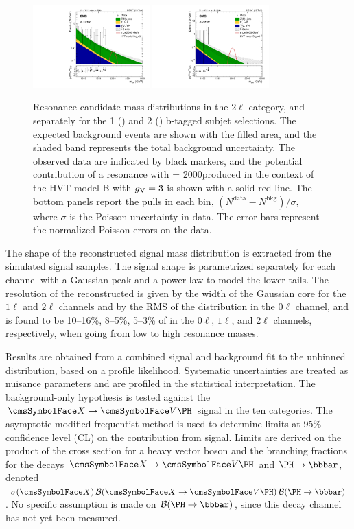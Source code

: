 \begin{figure}[!hbtp]\centering
 \includegraphics[width=0.40\textwidth]{B2G-16-003/Figure_002-e.pdf}
  \includegraphics[width=0.40\textwidth]{B2G-16-003/Figure_002-f.pdf}

  \caption{
    Resonance candidate mass \mVH distributions in the $2\ell$ category, and separately for the 1 (\cmsLeft) and 2 (\cmsRight) b-tagged 
subjet selections. The expected background events are shown with the filled area, and the shaded band represents the total background 
uncertainty. The observed data are indicated by black markers, and the potential contribution of a resonance with \mX = 2000\GeV produced 
in the context of the HVT model B with $g_\text{V}=3$ is shown with a solid red line. The bottom panels report the pulls in each bin, 
$(N^\text{data}-N^\text{bkg})/\sigma$, where $\sigma$ is the Poisson uncertainty in data. The error bars represent the normalized 
Poisson errors on the data.
    \label{fig:mX} }
\end{figure}



The shape of the reconstructed signal mass distribution is extracted from the simulated signal samples. The signal shape is parametrized 
separately for each channel with a Gaussian peak and a power law to model the lower tails.
The resolution of the reconstructed \mVH is given by the width of the Gaussian core for the $1\ell$ and $2\ell$ channels and by the RMS of 
the \mtVH distribution in the $0\ell$ channel, and is found to be 10--16\%, 8--5\%, 5--3\% of \mX in the $0\ell$, $1\ell$, and $2\ell$ 
channels, respectively, when going from low to high resonance masses.


Results are obtained from a combined signal and background fit to the unbinned \mVH distribution, based on a profile likelihood. Systematic 
uncertainties are treated as nuisance parameters and are profiled in the statistical 
interpretation. The background-only hypothesis is tested against the $\X\to\VH$ signal in the 
ten categories.
The asymptotic modified frequentist method is used to determine limits at 95\% confidence level (CL) on the contribution from signal.
Limits are derived on the product of the cross section for a heavy vector boson \X and the branching fractions for the decays $\X\to\VH$ 
and $\htobb$, denoted $\sigma(\X) \, \B(\X\to\VH) \, \B(\htobb)$. No specific assumption is made on $\B(\htobb)$, since this decay channel 
has not yet been measured.
 
